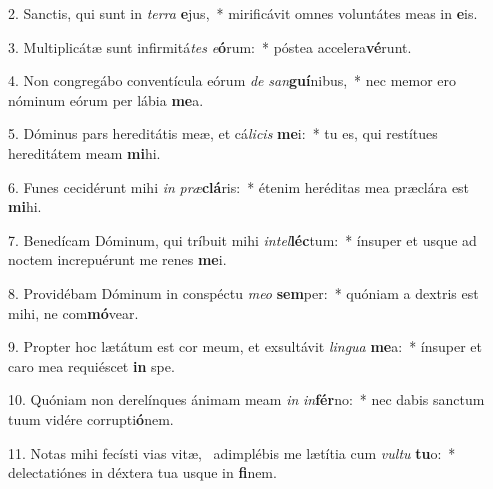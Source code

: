 2. Sanctis, qui sunt in \textit{ter}\textit{ra} \textbf{e}jus,~*  mirificávit omnes voluntátes meas in \textbf{e}is.\

3. Multiplicátæ sunt infirmitá\textit{tes} \textit{e}\textbf{ó}rum:~*  póstea accelera\textbf{vé}runt.\

4. Non congregábo conventícula eórum \textit{de} \textit{san}\textbf{guí}nibus,~*  nec memor ero nóminum eórum per lábia \textbf{me}a.\

5. Dóminus pars hereditátis meæ, et cá\textit{li}\textit{cis} \textbf{me}i:~*  tu es, qui restítues hereditátem meam \textbf{mi}hi.\

6. Funes cecidérunt mihi \textit{in} \textit{præ}\textbf{clá}ris:~*  étenim heréditas mea præclára est \textbf{mi}hi.\

7. Benedícam Dóminum, qui tríbuit mihi \textit{in}\textit{tel}\textbf{léc}tum:~*  ínsuper et usque ad noctem increpuérunt me renes \textbf{me}i.\

8. Providébam Dóminum in conspéctu \textit{me}\textit{o} \textbf{sem}per:~*  quóniam a dextris est mihi, ne com\textbf{mó}vear.\

9. Propter hoc lætátum est cor meum, et exsultávit \textit{lin}\textit{gua} \textbf{me}a:~*  ínsuper et caro mea requiéscet \textbf{in} spe.\

10. Quóniam non derelínques ánimam meam \textit{in} \textit{in}\textbf{fér}no:~*  nec dabis sanctum tuum vidére corrupti\textbf{ó}nem.\

11. Notas mihi fecísti vias vitæ, \dag\  adimplébis me lætítia cum \textit{vul}\textit{tu} \textbf{tu}o:~*  delectatiónes in déxtera tua usque in \textbf{fi}nem.\

